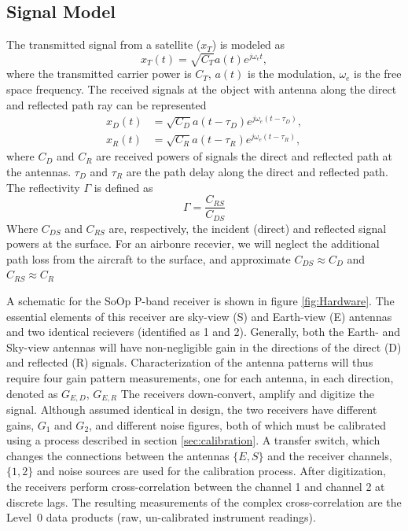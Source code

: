 \documentclass[draftcls,onecolumn]{IEEEtran}  %
\begin{document}
\subsection{Signal Model}
The transmitted signal from a satellite ($x_{T}$) is modeled as
\begin{equation}
	x_T(t)=\sqrt{C_T}a(t)e^{j\omega_et},
    \label{Eq:xT}
\end{equation}
where the transmitted carrier power is $C_{T}$, $a(t)$ is the modulation, $ω_{e}$ is the free space frequency. The received signals at the object with antenna along the direct and reflected path ray can be represented 
\begin{eqnarray}
  	x_D(t)&=\sqrt{C_D}a(t-\tau_D)e^{j\omega_e(t-\tau_D)}, \\
    x_R(t)&=\sqrt{C_R}a(t-\tau_R)e^{j\omega_e(t-\tau_R)}, 
    \label{Eq:xD_xR}
\end{eqnarray}
where $C_D$ and $C_R$ are received powers of signals the direct and reflected path at the antennas.  
$\tau_D$ and $\tau_R$ are the path delay along the direct and reflected path. The reflectivity $\Gamma$ is defined as
\begin{equation}
	\Gamma=\frac{C_{RS}}{C_{DS}}
    \label{Eq:reflect}
\end{equation}
Where $C_{DS}$ and $C_{RS}$ are, respectively, the incident (direct) and reflected signal powers at the surface. 
For an airbonre recevier, we will neglect the additional path loss from the aircraft to the surface, and approximate $C_{DS}\approx C_D$ and $C_{RS}\approx C_R$
 
A schematic for the SoOp P-band receiver is shown in figure \ref{fig:Hardware}. 
The essential elements of this receiver are sky-view (S) and Earth-view (E) antennas and two identical recievers (identified as 1 and 2). 
Generally, both the Earth- and Sky-view antennas will have non-negligible gain in the directions of the direct (D) and reflected (R) signals. 
Characterization of the antenna patterns will thus require four gain pattern measurements, one for each antenna, in each direction, denoted as $G_{E,D}$, 
$G_{E,R}$ 
The receivers down-convert, amplify and digitize the signal.  
Although assumed identical in design, the two receivers have different gains, $G_1$ and $G_2$, and different noise figures, both of which must be calibrated using a process described in section \ref{sec:calibration}.  
A transfer switch, which changes the connections between the antennas $\{ E, S \}$ and the receiver channels, $\{ 1, 2\}$ and noise sources are used for the calibration process. 
After digitization, the receivers  perform cross-correlation between the channel 1 and channel 2 at discrete lags. 
The resulting measurements of the complex cross-correlation are the Level~0 data products (raw, un-calibrated instrument readings). 
\end{document}
